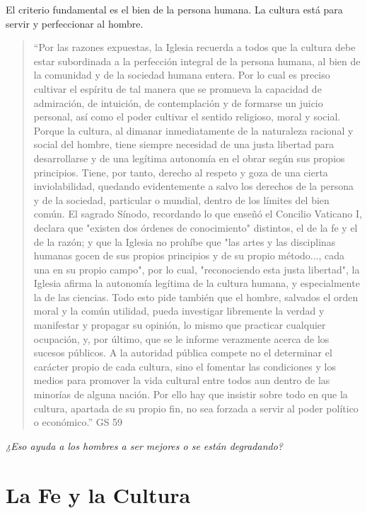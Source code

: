 \documentclass[a4paper,12pt,oneside]{article}
\begin{document}
El criterio fundamental es el bien de la persona humana. La cultura está para servir y perfeccionar al hombre.

\begin{quote}
“Por las razones expuestas, la Iglesia recuerda a todos que la cultura debe estar subordinada a la perfección integral de la persona humana, al bien de la comunidad y de la sociedad humana entera. Por lo cual es preciso cultivar el espíritu de tal manera que se promueva la capacidad de admiración, de intuición, de contemplación y de formarse un juicio personal, así como el poder cultivar el sentido religioso, moral y social. Porque la cultura, al dimanar inmediatamente de la naturaleza racional y social del hombre, tiene siempre necesidad de una justa libertad para desarrollarse y de una legítima autonomía en el obrar según sus propios principios. Tiene, por tanto, derecho al respeto y goza de una cierta inviolabilidad, quedando evidentemente a salvo los derechos de la persona y de la sociedad, particular o mundial, dentro de los límites del bien común. El sagrado Sínodo, recordando lo que enseñó el Concilio Vaticano I, declara que "existen dos órdenes de conocimiento" distintos, el de la fe y el de la razón; y que la Iglesia no prohíbe que "las artes y las disciplinas humanas gocen de sus propios principios y de su propio método..., cada una en su propio campo", por lo cual, "reconociendo esta justa libertad", la Iglesia afirma la autonomía legítima de la cultura humana, y especialmente la de las ciencias. Todo esto pide también que el hombre, salvados el orden moral y la común utilidad, pueda investigar libremente la verdad y manifestar y propagar su opinión, lo mismo que practicar cualquier ocupación, y, por último, que se le informe verazmente acerca de los sucesos públicos. A la autoridad pública compete no el determinar el carácter propio de cada cultura, sino el fomentar las condiciones y los medios para promover la vida cultural entre todos aun dentro de las minorías de alguna nación. Por ello hay que insistir sobre todo en que la cultura, apartada de su propio fin, no sea forzada a servir al poder político o económico.” GS 59
\end{quote}

\textit{¿Eso ayuda a los hombres a ser mejores o se están degradando?}

\section*{La Fe y la Cultura}
\end{document}
